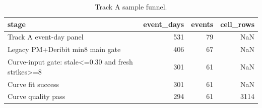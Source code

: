 \begin{table}
\caption{Track A sample funnel.}
\label{tab:trackA_sample_funnel}
\begin{tabular}{lrrr}
\toprule
stage & event\_days & events & cell\_rows \\
\midrule
Track A event-day panel & 531 & 79 & NaN \\
Legacy PM+Deribit min8 main gate & 406 & 67 & NaN \\
Curve-input gate: stale<=0.30 and fresh strikes>=8 & 301 & 61 & NaN \\
Curve fit success & 301 & 61 & NaN \\
Curve quality pass & 294 & 61 & 3114 \\
\bottomrule
\end{tabular}
\end{table}
